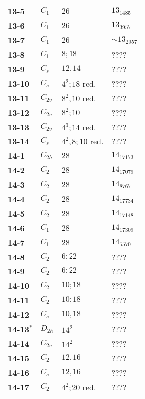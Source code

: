 \documentclass[12pt]{article}
\begin{document}
\begin{table}
\begin{center}
{\begin{minipage}[t]{7cm}
\begin{tabular}{||l|l|l|l||}
{\bf 13-5}      &$C_1$  &$26$           &$13_{1485}$\\
{\bf 13-6}      &$C_1$  &$26$           &$13_{3957}$\\
{\bf 13-7}      &$C_1$  &$26$           &$\sim 13_{2957}$\\
{\bf 13-8}      &$C_1$  &$8; 18$                &????\\
{\bf 13-9}      &$C_s$  &$12, 14$               &????\\
{\bf 13-10}     &$C_s$  &$4^2; 18$ red. &????\\
{\bf 13-11}     &$C_{2v}$       &$8^2, 10$ red. &????\\
{\bf 13-12}     &$C_{2v}$       &$8^2; 10$      &????\\
{\bf 13-13}     &$C_{2v}$       &$4^3; 14$ red. &????\\
{\bf 13-14}     &$C_s$  &$4^2,8;10$ red.        &????\\\hline
{\bf 14-1}      &$C_{2h}$       &$28$           &$14_{17173}$\\
{\bf 14-2}      &$C_{2}$        &$28$           &$14_{17079}$\\
{\bf 14-3}      &$C_2$  &$28$           &$14_{8767}$\\
{\bf 14-4}      &$C_2$  &$28$           &$14_{17734}$\\
{\bf 14-5}      &$C_2$  &$28$           &$14_{17148}$\\
{\bf 14-6}      &$C_1$  &$28$           &$14_{17309}$\\
{\bf 14-7}      &$C_1$  &$28$           &$14_{5570}$\\
{\bf 14-8}      &$C_{2}$        &$6; 22$                &????\\
{\bf 14-9}      &$C_2$  &$6; 22$                &????\\
{\bf 14-10}     &$C_2$  &$10; 18$               &????\\
{\bf 14-11}     &$C_2$  &$10; 18$               &????\\
{\bf 14-12}     &$C_s$  &$10, 18$               &????\\
{\bf 14-13${}^{*}$}     &$D_{2h}$       &$14^2$         &????\\
{\bf 14-14}     &$C_{2v}$       &$14^2$         &????\\
{\bf 14-15}     &$C_2$  &$12, 16$               &????\\
{\bf 14-16}     &$C_{s}$        &$12, 16$               &????\\
{\bf 14-17}     &$C_2$  &$4^2; 20$ red. &????\\

\end{tabular}
\end{minipage}}
\end{center}
\end{table}
\end{document}
